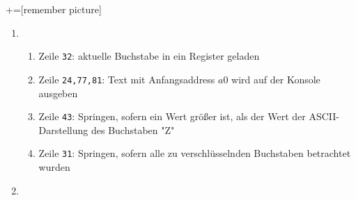 \newcommand{\boxy}[2][yellow]{\mathchoice%
  {\pgfsetfillopacity{0.3}\colorbox{#1}{\pgfsetfillopacity{1}$\displaystyle#2$}}%
  {\pgfsetfillopacity{0.3}\colorbox{#1}{\pgfsetfillopacity{1}$\textstyle#2$}}%
  {\pgfsetfillopacity{0.3}\colorbox{#1}{\pgfsetfillopacity{1}$\scriptstyle#2$}}%
  {\pgfsetfillopacity{0.3}\colorbox{#1}{\pgfsetfillopacity{1}$\scriptscriptstyle#2$}}}%

\let\bnot\xoverline
\let\bnor\downarrow
\newcommand{\xorexpanded}[2]{\bnot{#1}#2 \lor #1\bnot{#2}}
\newcommand{\xor}[0]{\nleftrightarrow}
\newcommand{\linenum}[1]{\textcolor{RedViolet}{\texttt{#1}}}
+=[remember picture]

\begin{enumerate}[label={[OH\arabic*]},start=10]
    \item
        \begin{enumerate}
            \makeatletter
                \setlength{\leftmargins}{\@totalleftmargin}
            \makeatother

            \item 
                \begin{enumerate}
                    \item Zeile \linenum{32}: aktuelle Buchstabe in ein Register geladen
                    \item Zeile \linenum{24,77,81}: Text mit Anfangsaddress $a0$ wird auf der Konsole ausgeben
                    \item Zeile \linenum{43}: Springen, sofern ein Wert größer ist, als der Wert der ASCII-Darstellung des Buchstaben "Z"
                    \item Zeile \linenum{31}: Springen, sofern alle zu verschlüsselnden Buchstaben betrachtet wurden
                \end{enumerate}

            \item \blanko
                { \small \inputminted[linenos,firstnumber=last,autogobble,xleftmargin=-\leftmargins,frame=leftline,framesep=10pt]{mipslexer.py:MIPSLexer -x}{caeser.s} }
        \end{enumerate}
\end{enumerate}